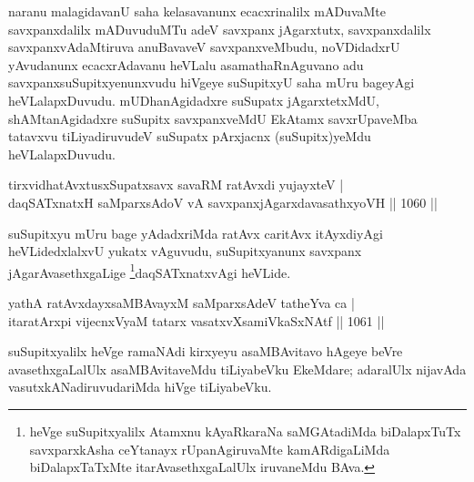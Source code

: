 \begin{artha}
naranu malagidavanU saha kelasavanunx ecacxrinalilx mADuvaMte savxpanxdalilx mADuvuduMTu adeV savxpanx jAgarxtutx, savxpanxdalilx savxpanxvAdaMtiruva anuBavaveV savxpanxveMbudu, noVDidadxrU yAvudanunx ecacxrAdavanu heVLalu asamathaRnAguvano adu savxpanxsuSupitxyenunxvudu hiVgeye suSupitxyU saha mUru bageyAgi heVLalapxDuvudu. mUDhanAgidadxre suSupatx jAgarxtetxMdU, shAMtanAgidadxre suSupitx savxpanxveMdU EkAtamx savxrUpaveMba tatavxvu tiLiyadiruvudeV suSupatx pArxjacnx (suSupitx)yeMdu heVLalapxDuvudu.
\end{artha}


\begin{shl}
tirxvidhatAvxtusxSupatxsavx savaRM ratAvxdi yujayxteV | \\
daqSATxnatxH saMparxsAdoV vA savxpanxjAgarxdavasathxyoVH \hfill||  1060 ||  
\end{shl}

\begin{artha}
suSupitxyu mUru bage yAdadxriMda ratAvx caritAvx itAyxdiyAgi heVLidedxlalxvU yukatx vAguvudu, suSupitxyanunx savxpanx jAgarAvasethxgaLige \footnote{heVge suSupitxyalilx Atamxnu kAyaRkaraNa saMGAtadiMda biDalapxTuTx savxparxkAsha ceYtanayx rUpanAgiruvaMte kamARdigaLiMda biDalapxTaTxMte itarAvasethxgaLalUlx iruvaneMdu BAva.}daqSATxnatxvAgi heVLide.
\end{artha}


\begin{shl}
yathA ratAvxdayxsaMBAvayxM saMparxsAdeV tatheYva ca | \\
itaratArxpi vijecnxVyaM \footnotemark[1]tatarx vasatxvXsamiVkaSxNAtf \hfill||  1061 ||  
\end{shl}

\begin{artha}
suSupitxyalilx heVge ramaNAdi kirxyeyu asaMBAvitavo hAgeye beVre avasethxgaLalUlx asaMBAvitaveMdu tiLiyabeVku EkeMdare; adaralUlx nijavAda vasutxkANadiruvudariMda hiVge tiLiyabeVku.
\end{artha}


